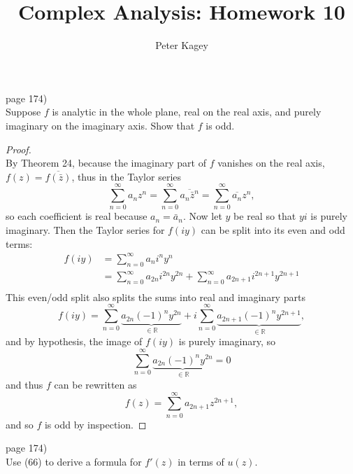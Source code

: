 \documentclass{article}
\newenvironment{problem}[2][Problem]{\begin{trivlist}
\item[\hskip \labelsep {\bfseries #1}\hskip \labelsep {\bfseries #2.}]}{\end{trivlist}}
\begin{document}
\title{Complex Analysis: Homework 10}
\author{Peter Kagey}

\maketitle

\begin{problem}{1} (page 174) \\
  Suppose $f$ is analytic in the whole plane, real on the real axis, and purely
  imaginary on the imaginary axis. Show that $f$ is odd.
\end{problem}
\begin{proof} \text{} \\
  By Theorem 24, because the imaginary part of $f$ vanishes on the real axis,
  $f(z) = \overline{f(\bar{z})}$, thus in the Taylor series \[
    \sum_{n = 0}^\infty a_n z^n
    = \sum_{n = 0}^\infty \overline{a_n \bar{z}^n}
    = \sum_{n = 0}^\infty \overline{a_n} z^n,
  \] so each coefficient is real because $a_n = \bar{a}_n$.
  Now let $y$ be real so that $yi$ is purely imaginary. Then the Taylor series
  for $f(iy)$ can be split into its even and odd terms: \begin{align*}
    f(iy) &= \sum_{n = 0}^\infty a_n i^n y^n \\
          &= \sum_{n = 0}^\infty a_{2n} i^{2n} y^{2n}
            + \sum_{n = 0}^\infty a_{2n+1} i^{2n+1} y^{2n+1} \\
  \end{align*}
  This even/odd split also splits the sums into real and imaginary parts \[
    f(iy)= \sum_{n = 0}^\infty \underbrace{a_{2n} (-1)^n y^{2n}}_{\in \mathbb{R}}
      + i\sum_{n = 0}^\infty \underbrace{a_{2n+1} (-1)^n y^{2n+1}}_{\in \mathbb{R}},
  \] and by hypothesis, the image of $f(iy)$ is purely imaginary, so \[
    \sum_{n = 0}^\infty \underbrace{a_{2n} (-1)^n y^{2n}}_{\in \mathbb{R}} = 0
  \] and thus $f$ can be rewritten as \[
    f(z) = \sum_{n = 0}^\infty a_{2n+1} z^{2n+1},
  \] and so $f$ is odd by inspection.
\end{proof}
\pagebreak

\begin{problem}{4} (page 174) \\
  Use (66) to derive a formula for $f'(z)$ in terms of $u(z)$.
\end{problem}
\end{document}
